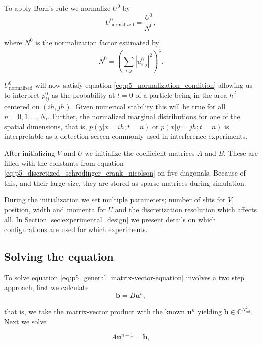 \documentclass[../main_proj5.tex]{subfiles}
\begin{document}
To apply Born's rule we normalize $U^{0}$ by 
\begin{equation}
    U_{\operatorname{normalized}}^{0} = \frac{U^{0}}{N^{0}},
\end{equation}

\noindent where $N^{0}$ is the normalization factor estimated by
\begin{equation}
    N^{0} = \left(
    \sum\limits_{i,j} |u_{i,j}^{0}|^{2}
    \right)^{\frac{1}{2}} .
\end{equation}

\noindent $U_{\operatorname{normalized}}^{0}$ will now satisfy equation \eqref{eq:p5_normalization_condition} allowing us to interpret $p_{ij}^{0}$ as the probability at $t=0$ of a particle being in the area $h^{2}$ centered on $(ih, jh)$. Given numerical stability this will be true for all $n = 0, 1, ..., N_t$. Further, the normalized marginal distributions for one of the spatial dimensions, that is, $p(y| x=ih ; t=n)$ or $p(x|y=jh; t=n)$ is interpretable as a detection screen commonly used in interference experiments.

After initializing $V$ and $U$ we initialize the coefficient matrices $A$ and $B$. These are filled with the constants from equation \eqref{eq:p5_discretized_schrodinger_crank_nicolson} on five diagonals. Because of this, and their large size, they are stored as sparse matrices during simulation.

During the initialization we set multiple parameters; number of slits for $V$, position, width and momenta for $U$ and the discretization resolution which affects all. In Section \ref{sec:experimental_design} we present  details on which configurations are used for which experiments. 

\subsection{Solving the equation}



To solve equation \eqref{eq:p5_general_matrix-vector-equation} involves a two step approach; first we  calculate 
\begin{equation}
    \mathbf{b} = B \mathbf{u}^{n} ,
\end{equation}


\noindent that is, we take the matrix-vector product with the known $\mathbf{u}^n$ yielding $\mathbf{b}\in \mathbb{C}^{N_{int}^{2}}$. Next we solve 

\begin{equation}
    A \mathbf{u}^{n+1} =\mathbf{b} ,
\end{equation}
\end{document}
